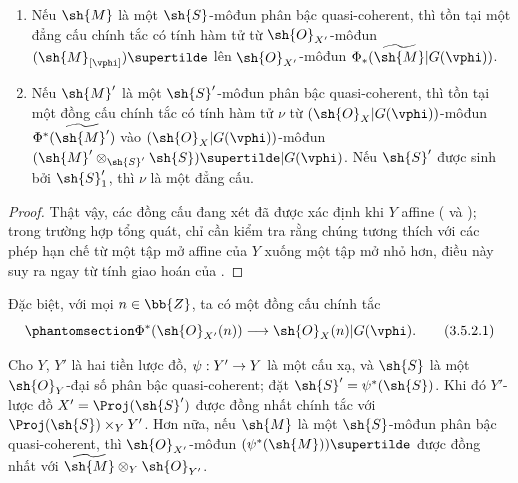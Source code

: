 \documentclass[oneside,10pt]{amsart}
\makeatletter
\newcommand{\ega@arrow}[2]{\mathchoice{#1}{#2}{#2}{#2}}
\renewcommand{\to}{\ega@arrow{\longrightarrow}{\rightarrow}}
\let\EGAOriginalLabel\label
\renewcommand{\label}[1]{\phantomsection\EGAOriginalLabel{#1}}
\makeatother
\begin{document}
\begin{proposition}[3.5.2]
\label{II.3.5.2}
\medskip\noindent
\begin{enumerate}
  \item[(i)] Nếu $\sh{M}$ là một $\sh{S}$-môđun phân bậc quasi-coherent, thì tồn tại một đẳng cấu chính tắc có tính hàm tử từ $\sh{O}_{X'}$-môđun $(\sh{M}_{[\vphi]})\supertilde$ lên $\sh{O}_{X'}$-môđun $\Phi_*(\widetilde{\sh{M}}|G(\vphi))$.
  \item[(ii)] Nếu $\sh{M}'$ là một $\sh{S}'$-môđun phân bậc quasi-coherent, thì tồn tại một đồng cấu chính tắc có tính hàm tử $\nu$ từ $(\sh{O}_X|G(\vphi))$-môđun $\Phi^*(\widetilde{\sh{M}'})$ vào $(\sh{O}_X|G(\vphi))$-môđun $(\sh{M}'\otimes_{\sh{S}'}\sh{S})\supertilde|G(\vphi)$.
    Nếu $\sh{S}'$ được sinh bởi $\sh{S}'_1$, thì $\nu$ là một đẳng cấu.
\end{enumerate}
\end{proposition}

\begin{proof}
Thật vậy, các đồng cấu đang xét đã được xác định khi $Y$ affine ( và );
trong trường hợp tổng quát, chỉ cần kiểm tra rằng chúng tương thích với các phép hạn chế từ một tập mở affine của $Y$ xuống một tập mở nhỏ hơn, điều này suy ra ngay từ tính giao hoán của .
\end{proof}

Đặc biệt, với mọi $n\in\bb{Z}$, ta có một đồng cấu chính tắc
\[
\label{II.3.5.2.1}
  \Phi^*(\sh{O}_{X'}(n))\to\sh{O}_X(n)|G(\vphi).
\tag{3.5.2.1}
\]

\begin{proposition}[3.5.3]
\label{II.3.5.3}
Cho $Y$, $Y'$ là hai tiền lược đồ, $\psi:Y'\to Y$ là một cấu xạ, và $\sh{S}$ là một $\sh{O}_Y$-đại số phân bậc quasi-coherent; đặt $\sh{S}'=\psi^*(\sh{S})$.
Khi đó $Y'$-lược đồ $X'=\Proj(\sh{S}')$ được đồng nhất chính tắc với $\Proj(\sh{S})\times_Y Y'$.
Hơn nữa, nếu $\sh{M}$ là một $\sh{S}$-môđun phân bậc quasi-coherent, thì $\sh{O}_{X'}$-môđun $(\psi^*(\sh{M}))\supertilde$ được đồng nhất với $\widetilde{\sh{M}}\otimes_Y\sh{O}_{Y'}$.
\end{proposition}
\end{document}
